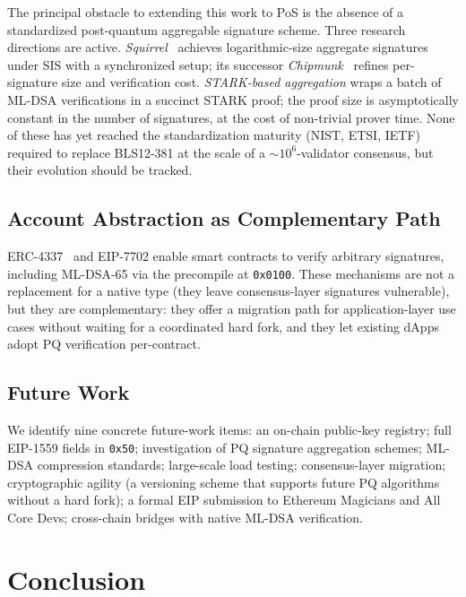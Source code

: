 \documentclass[journal,onecolumn,11pt]{IEEEtran}
\begin{document}
The principal obstacle to extending this work to PoS is the absence of a standardized post-quantum aggregable signature scheme. Three research directions are active. \emph{Squirrel}~\cite{fleischhacker2022squirrel} achieves logarithmic-size aggregate signatures under SIS with a synchronized setup; its successor \emph{Chipmunk}~\cite{fleischhacker2023chipmunk} refines per-signature size and verification cost. \emph{STARK-based aggregation} wraps a batch of ML-DSA verifications in a succinct STARK proof; the proof size is asymptotically constant in the number of signatures, at the cost of non-trivial prover time. None of these has yet reached the standardization maturity (NIST, ETSI, IETF) required to replace BLS12-381 at the scale of a $\sim$$10^6$-validator consensus, but their evolution should be tracked.

\subsection{Account Abstraction as Complementary Path}

ERC-4337~\cite{eip4337} and EIP-7702 enable smart contracts to verify arbitrary signatures, including ML-DSA-65 via the precompile at \texttt{0x0100}. These mechanisms are not a replacement for a native type (they leave consensus-layer signatures vulnerable), but they are complementary: they offer a migration path for application-layer use cases without waiting for a coordinated hard fork, and they let existing dApps adopt PQ verification per-contract.

\subsection{Future Work}

We identify nine concrete future-work items: an on-chain public-key registry; full EIP-1559 fields in \texttt{0x50}; investigation of PQ signature aggregation schemes; ML-DSA compression standards; large-scale load testing; consensus-layer migration; cryptographic agility (a versioning scheme that supports future PQ algorithms without a hard fork); a formal EIP submission to Ethereum Magicians and All Core Devs; cross-chain bridges with native ML-DSA verification.

\section{Conclusion}
\label{sec:conclusion}
\end{document}
